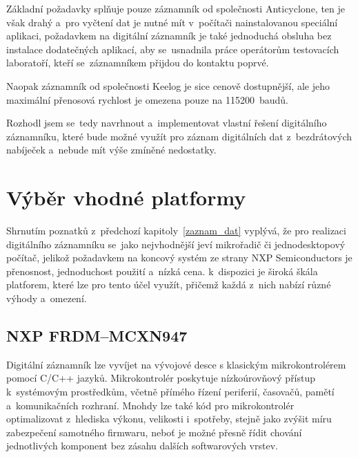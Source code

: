 Základní požadavky splňuje pouze záznamník od společnosti Anticyclone, ten je však drahý a~pro vyčtení dat je nutné mít v~počítači nainstalovanou speciální aplikaci, požadavkem na digitální záznamník je také jednoduchá obsluha bez instalace dodatečných aplikací, aby se~usnadnila práce operátorům testovacích laboratoří, kteří se~záznamníkem přijdou do kontaktu poprvé. 

Naopak záznamník od společnosti Keelog je sice cenově dostupnější, ale jeho maximální přenosová rychlost je omezena pouze na 115200~baudů.

Rozhodl jsem se~tedy navrhnout a~implementovat vlastní řešení digitálního záznamníku, které bude možné využít pro záznam digitálních dat z~bezdrátových nabíječek a~nebude mít výše zmíněné nedostatky.

\section{Výběr vhodné platformy}
\label{vyber_vhodne_platformy}
Shrnutím poznatků z~předchozí kapitoly~\ref{zaznam_dat} vyplývá, že pro realizaci digitálního záznamníku se~jako nejvhodnější jeví mikrořadič či jednodesktopový počítač, jelikož požadavkem na koncový systém ze strany NXP Semiconductors je přenosnost, jednoduchost použití a~nízká cena. k~dispozici je široká škála platforem, které lze pro tento účel využít, přičemž každá z~nich nabízí různé výhody a~omezení.

\subsection{NXP FRDM--MCXN947}
\label{nxp_frdm_mcxn947}
Digitální záznamník lze vyvíjet na vývojové desce s klasickým mikrokontrolérem pomocí C/C++ jazyků. Mikrokontrolér poskytuje nízkoúrovňový přístup k~systémovým prostředkům, včetně přímého řízení periferií, časovačů, pamětí a~komunikačních rozhraní. Mnohdy lze také kód pro mikrokontrolér optimalizovat z~hlediska výkonu, velikosti i~spotřeby, stejně jako zvýšit míru zabezpečení samotného firmwaru, neboť je možné přesně řídit chování jednotlivých komponent bez zásahu dalších softwarových vrstev.

